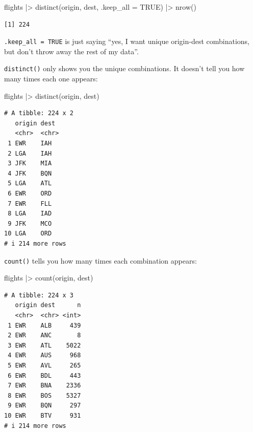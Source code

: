 \documentclass[
  letterpaper,
  DIV=11,
  numbers=noendperiod]{scrreprt}
\newenvironment{Shaded}{\begin{snugshade}}{\end{snugshade}}
\newcommand{\AttributeTok}[1]{\textcolor[rgb]{0.40,0.45,0.13}{#1}}
\newcommand{\ConstantTok}[1]{\textcolor[rgb]{0.56,0.35,0.01}{#1}}
\newcommand{\FunctionTok}[1]{\textcolor[rgb]{0.28,0.35,0.67}{#1}}
\newcommand{\NormalTok}[1]{\textcolor[rgb]{0.00,0.23,0.31}{#1}}
\newcommand{\SpecialCharTok}[1]{\textcolor[rgb]{0.37,0.37,0.37}{#1}}
\begin{document}
\begin{Shaded}
\begin{Highlighting}[]
\NormalTok{flights }\SpecialCharTok{|\textgreater{}}
  \FunctionTok{distinct}\NormalTok{(origin, dest, }\AttributeTok{.keep\_all =} \ConstantTok{TRUE}\NormalTok{) }\SpecialCharTok{|\textgreater{}}
  \FunctionTok{nrow}\NormalTok{()}
\end{Highlighting}
\end{Shaded}

\begin{verbatim}
[1] 224
\end{verbatim}

\texttt{.keep\_all\ =\ TRUE} is just saying ``yes, I want unique
origin-dest combinations, but don't throw away the rest of my data''.

\texttt{distinct()} only shows you the unique combinations. It doesn't
tell you how many times each one appears:

\begin{Shaded}
\begin{Highlighting}[]
\NormalTok{flights }\SpecialCharTok{|\textgreater{}}
  \FunctionTok{distinct}\NormalTok{(origin, dest)}
\end{Highlighting}
\end{Shaded}

\begin{verbatim}
# A tibble: 224 x 2
   origin dest 
   <chr>  <chr>
 1 EWR    IAH  
 2 LGA    IAH  
 3 JFK    MIA  
 4 JFK    BQN  
 5 LGA    ATL  
 6 EWR    ORD  
 7 EWR    FLL  
 8 LGA    IAD  
 9 JFK    MCO  
10 LGA    ORD  
# i 214 more rows
\end{verbatim}

\texttt{count()} tells you how many times each combination appears:

\begin{Shaded}
\begin{Highlighting}[]
\NormalTok{flights }\SpecialCharTok{|\textgreater{}}
  \FunctionTok{count}\NormalTok{(origin, dest)}
\end{Highlighting}
\end{Shaded}

\begin{verbatim}
# A tibble: 224 x 3
   origin dest      n
   <chr>  <chr> <int>
 1 EWR    ALB     439
 2 EWR    ANC       8
 3 EWR    ATL    5022
 4 EWR    AUS     968
 5 EWR    AVL     265
 6 EWR    BDL     443
 7 EWR    BNA    2336
 8 EWR    BOS    5327
 9 EWR    BQN     297
10 EWR    BTV     931
# i 214 more rows
\end{verbatim}
\end{document}
